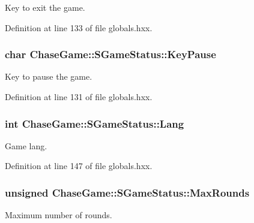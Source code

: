 Key to exit the game. 



Definition at line 133 of file globals.\-hxx.

\hypertarget{struct_chase_game_1_1_s_game_status_aaa0cca00432a2ac7fae4be521164f5c2}{
\subsubsection[{Key\-Pause}]{\setlength{\rightskip}{0pt plus 5cm}char Chase\-Game\-::\-S\-Game\-Status\-::\-Key\-Pause}}\label{struct_chase_game_1_1_s_game_status_aaa0cca00432a2ac7fae4be521164f5c2}


Key to pause the game. 



Definition at line 131 of file globals.\-hxx.

\hypertarget{struct_chase_game_1_1_s_game_status_a93c5db2ceb07569075406e865949b4d9}{
\subsubsection[{Lang}]{\setlength{\rightskip}{0pt plus 5cm}int Chase\-Game\-::\-S\-Game\-Status\-::\-Lang}}\label{struct_chase_game_1_1_s_game_status_a93c5db2ceb07569075406e865949b4d9}


Game lang. 



Definition at line 147 of file globals.\-hxx.

\hypertarget{struct_chase_game_1_1_s_game_status_a812deafc733953eaa199eba4ea8216f7}{
\subsubsection[{Max\-Rounds}]{\setlength{\rightskip}{0pt plus 5cm}unsigned Chase\-Game\-::\-S\-Game\-Status\-::\-Max\-Rounds}}\label{struct_chase_game_1_1_s_game_status_a812deafc733953eaa199eba4ea8216f7}


Maximum number of rounds. 



